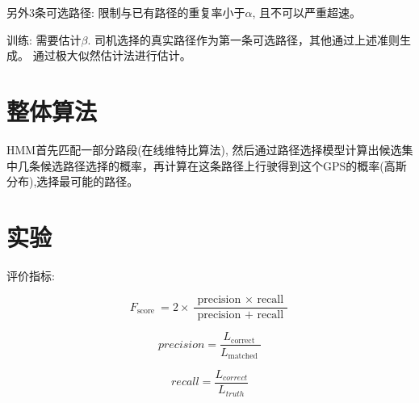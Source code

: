另外3条可选路径: 限制与已有路径的重复率小于$\alpha$, 且不可以严重超速。

训练: 需要估计$\beta$. 司机选择的真实路径作为第一条可选路径，其他通过上述准则生成。 通过极大似然估计法进行估计。

\section{整体算法}

HMM首先匹配一部分路段(在线维特比算法), 然后通过路径选择模型计算出候选集中几条候选路径选择的概率，再计算在这条路径上行驶得到这个GPS的概率(高斯分布),选择最可能的路径。

\section{实验}

评价指标:

\begin{equation} F_{\text {score }}=2 \times \frac{\text { precision } \times \text { recall }}{\text { precision }+\text { recall }} \end{equation}

\begin{equation}precision  =\frac{L_{\text {correct }}}{L_{\text {matched }}} \end{equation}

\begin{equation}recall = \frac{L_{correct}}{L_{truth}}\end{equation}